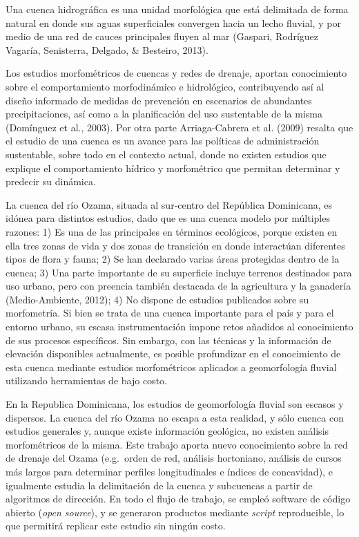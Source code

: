 \documentclass[11pt,]{article}
\begin{document}
Una cuenca hidrográfica es una unidad morfológica que está delimitada de
forma natural en donde sus aguas superficiales convergen hacia un lecho
fluvial, y por medio de una red de cauces principales fluyen al mar
(Gaspari, Rodríguez Vagaría, Senisterra, Delgado, \& Besteiro, 2013).

Los estudios morfométricos de cuencas y redes de drenaje, aportan
conocimiento sobre el comportamiento morfodinámico e hidrológico,
contribuyendo así al diseño informado de medidas de prevención en
escenarios de abundantes precipitaciones, así como a la planificación
del uso sustentable de la misma (Domínguez et al., 2003). Por otra parte
Arriaga-Cabrera et al. (2009) resalta que el estudio de una cuenca es un
avance para las políticas de administración sustentable, sobre todo en
el contexto actual, donde no existen estudios que explique el
comportamiento hídrico y morfométrico que permitan determinar y predecir
su dinámica.

La cuenca del río Ozama, situada al sur-centro del República Dominicana,
es idónea para distintos estudios, dado que es una cuenca modelo por
múltiples razones: 1) Es una de las principales en términos ecológicos,
porque existen en ella tres zonas de vida y dos zonas de transición en
donde interactúan diferentes tipos de flora y fauna; 2) Se han declarado
varias áreas protegidas dentro de la cuenca; 3) Una parte importante de
su superficie incluye terrenos destinados para uso urbano, pero con
preencia también destacada de la agricultura y la ganadería
(Medio-Ambiente, 2012); 4) No dispone de estudios publicados sobre su
morfometría. Si bien se trata de una cuenca importante para el país y
para el entorno urbano, su escasa instrumentación impone retos añadidos
al conocimiento de sus procesos específicos. Sin embargo, con las
técnicas y la información de elevación disponibles actualmente, es
posible profundizar en el conocimiento de esta cuenca mediante estudios
morfométricos aplicados a geomorfología fluvial utilizando herramientas
de bajo costo.

En la Republica Dominicana, los estudios de geomorfología fluvial son
escasos y dispersos. La cuenca del río Ozama no escapa a esta realidad,
y sólo cuenca con estudios generales y, aunque existe información
geológica, no existen análisis morfométricos de la misma. Este trabajo
aporta nuevo conocimiento sobre la red de drenaje del Ozama (e.g.~orden
de red, análisis hortoniano, análisis de cursos más largos para
determinar perfiles longitudinales e índices de concavidad), e
igualmente estudia la delimitación de la cuenca y subcuencas a partir de
algoritmos de dirección. En todo el flujo de trabajo, se empleó software
de código abierto (\emph{open source}), y se generaron productos
mediante \emph{script} reproducible, lo que permitirá replicar este
estudio sin ningún costo.
\end{document}
